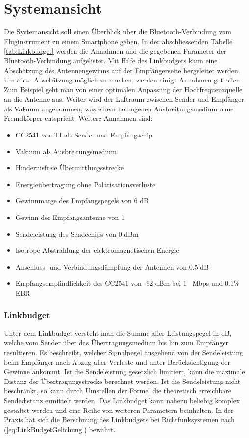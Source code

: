 \section{Systemansicht}
Die Systemansicht soll einen Überblick über die Bluetooth-Verbindung vom Fluginstrument zu einem Smartphone geben.
In der abschliessenden Tabelle \ref{tab:Linkbudget} werden die Annahmen und  die gegebenen Parameter der Bluetooth-Verbindung aufgelistet. Mit Hilfe des Linkbudgets kann eine Abschätzung des Antennengewinns auf der Empfängerseite hergeleitet werden. Um diese Abschätzung möglich zu machen, werden einige Annahmen getroffen. Zum Beispiel geht man von einer optimalen Anpassung der Hochfrequenzquelle an die Antenne aus. Weiter wird der Luftraum zwischen Sender und Empfänger als Vakuum angenommen, was einem homogenen Ausbreitungsmedium ohne Fremdkörper entspricht.
Weitere Annahmen sind:
\begin{itemize}
\item CC2541 von TI als Sende- und Empfangschip
\item Vakuum als Ausbreitungsmedium
\item Hindernisfreie Übermittlungsstrecke
\item Energieübertragung ohne Polarisationsverluste
\item Gewinnmarge des Empfangspegels von 6 dB
\item Gewinn der Empfangsantenne von 1
\item Sendeleistung des Sendechips von 0 dBm
\item Isotrope Abstrahlung der elektromagnetischen Energie
\item Anschluss- und Verbindungsdämpfung der Antennen von 0.5 dB
\item Empfangsempfindlichkeit des CC2541 von -92 dBm bei 1 \ Mbps und 0.1\% EBR 
\end{itemize}


\subsubsection{Linkbudget}
Unter dem Linkbudget versteht man die Summe aller Leistungspegel in dB, welche vom Sender über das Übertragungsmedium bis hin zum Empfänger resultieren. Es beschreibt, welcher Signalpegel ausgehend von der Sendeleistung beim Empfänger nach Abzug aller Verluste und unter Berücksichtigung der Gewinne ankommt. Ist die Sendeleistung gesetzlich limitiert, kann die maximale Distanz der Übertragungsstrecke berechnet werden. Ist die Sendeleistung nicht beschränkt, so kann durch Umstellen der Formel die theoretisch erreichbare Sendedistanz ermittelt werden. Das Linkbudget kann nahezu beliebig komplex gestaltet werden und eine Reihe von weiteren Parametern beinhalten. In der Praxis hat sich die Berechnung des Linkbudgets bei Richtfunksystemen nach   (\ref{eq:LinkBudgetGelichung}) bewährt.

